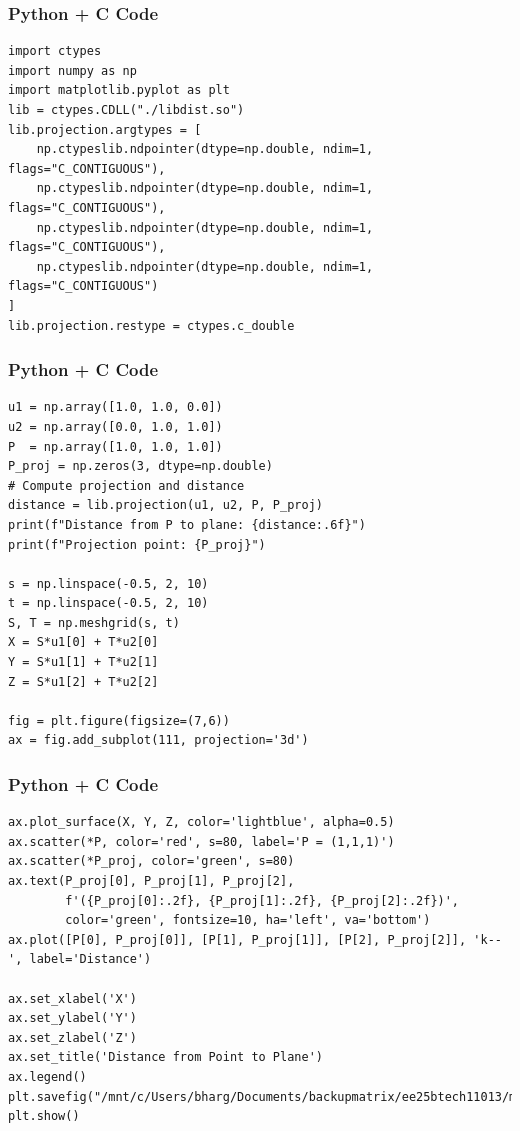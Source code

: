 \documentclass{beamer}
\begin{document}
\begin{frame}[fragile]
    \frametitle{Python + C Code}
    \begin{lstlisting}
import ctypes
import numpy as np
import matplotlib.pyplot as plt
lib = ctypes.CDLL("./libdist.so")
lib.projection.argtypes = [
    np.ctypeslib.ndpointer(dtype=np.double, ndim=1, flags="C_CONTIGUOUS"),
    np.ctypeslib.ndpointer(dtype=np.double, ndim=1, flags="C_CONTIGUOUS"),
    np.ctypeslib.ndpointer(dtype=np.double, ndim=1, flags="C_CONTIGUOUS"),
    np.ctypeslib.ndpointer(dtype=np.double, ndim=1, flags="C_CONTIGUOUS")
]
lib.projection.restype = ctypes.c_double

    \end{lstlisting}
\end{frame}
\begin{frame}[fragile]
    \frametitle{Python + C Code}
    \begin{lstlisting}
u1 = np.array([1.0, 1.0, 0.0])
u2 = np.array([0.0, 1.0, 1.0])
P  = np.array([1.0, 1.0, 1.0])
P_proj = np.zeros(3, dtype=np.double)
# Compute projection and distance
distance = lib.projection(u1, u2, P, P_proj)
print(f"Distance from P to plane: {distance:.6f}")
print(f"Projection point: {P_proj}")

s = np.linspace(-0.5, 2, 10)
t = np.linspace(-0.5, 2, 10)
S, T = np.meshgrid(s, t)
X = S*u1[0] + T*u2[0]
Y = S*u1[1] + T*u2[1]
Z = S*u1[2] + T*u2[2]

fig = plt.figure(figsize=(7,6))
ax = fig.add_subplot(111, projection='3d')

    \end{lstlisting}
\end{frame}
\begin{frame}[fragile]
    \frametitle{Python + C Code}
    \begin{lstlisting}
ax.plot_surface(X, Y, Z, color='lightblue', alpha=0.5)
ax.scatter(*P, color='red', s=80, label='P = (1,1,1)')
ax.scatter(*P_proj, color='green', s=80)
ax.text(P_proj[0], P_proj[1], P_proj[2],
        f'({P_proj[0]:.2f}, {P_proj[1]:.2f}, {P_proj[2]:.2f})',
        color='green', fontsize=10, ha='left', va='bottom')
ax.plot([P[0], P_proj[0]], [P[1], P_proj[1]], [P[2], P_proj[2]], 'k--', label='Distance')

ax.set_xlabel('X')
ax.set_ylabel('Y')
ax.set_zlabel('Z')
ax.set_title('Distance from Point to Plane')
ax.legend()
plt.savefig("/mnt/c/Users/bharg/Documents/backupmatrix/ee25btech11013/matgeo/12.547/figs/Figure_1.png")
plt.show()
    \end{lstlisting}
\end{frame}
\end{document}
